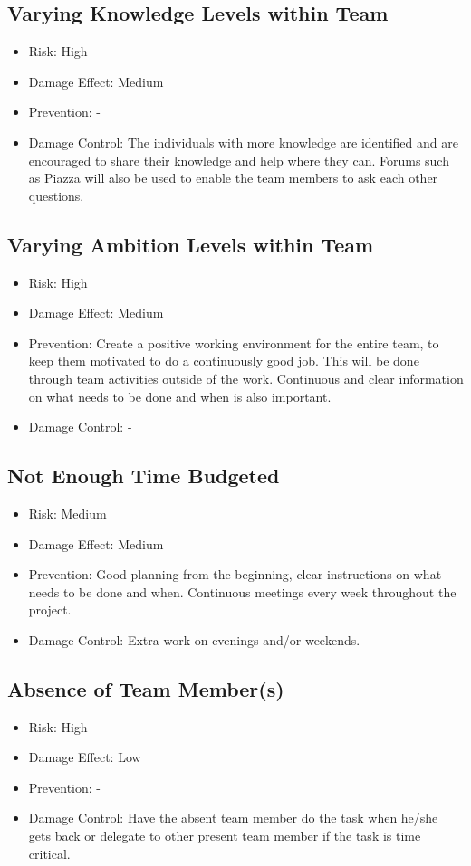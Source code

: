 \documentclass[a4paper]{article}
\begin{document}
\subsection{Varying Knowledge Levels within Team}
\begin{itemize}
\item Risk: High
\item Damage Effect: Medium
\item Prevention: -
\item Damage Control: The individuals with more knowledge are identified and are encouraged to share their knowledge and help where they can. Forums such as Piazza will also be used to enable the team members to ask each other questions. 
\end{itemize}

\subsection{Varying Ambition Levels within Team}
\begin{itemize}
\item Risk: High
\item Damage Effect: Medium
\item Prevention: Create a positive working environment for the entire team, to keep them motivated to do a continuously good job. This will be done through team activities outside of the work. Continuous and clear information on what needs to be done and when is also important.
\item Damage Control: - 
\end{itemize}

\subsection{Not Enough Time Budgeted}
\begin{itemize}
\item Risk: Medium 
\item Damage Effect: Medium
\item Prevention: Good planning from the beginning, clear instructions on what needs to be done and when. Continuous meetings every week throughout the project.
\item Damage Control: Extra work on evenings and/or weekends.
\end{itemize}

\subsection{Absence of Team Member(s)}
\begin{itemize}
\item Risk: High
\item Damage Effect: Low
\item Prevention: -
\item Damage Control: Have the absent team member do the task when he/she gets back or delegate to other present team member if the task is time critical.
\end{itemize}
\end{document}

